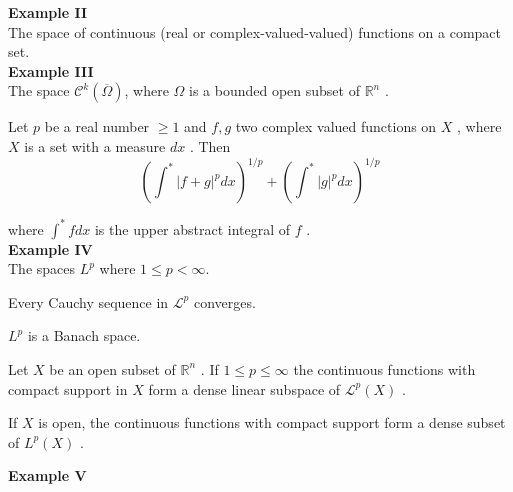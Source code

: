 \textbf{Example II} \\
The space of continuous (real or complex-valued-valued) functions on a compact set. \\

\textbf{Example III} \\
The space $ \mathcal{C}^{ k } \left( \overline{ \Omega } \right) $, where $ \Omega $ is a bounded open subset of $ \mathbb{R}^{ n } $ .

\begin{thm}
	Let $ p $ be a real number $ \geq 1 $ and $ f,g $ two complex valued functions on $ X $ , where $ X $ is a set with a measure $ dx $ . Then 
	\[
		\left( \int^{ * } \vert f+g \vert^{ p } dx \right)^{ 1/p } + \left( \int^{ * } \vert g \vert^{ p } dx \right)^{ 1/p }
	\]
\end{thm}

where $ \int^{ * }f dx $ is the upper abstract integral of $ f $ . \\

\textbf{Example IV} \\
The spaces $ L^p $ where $ 1 \leq p  < \infty$. \\

\begin{thm}
	Every Cauchy sequence in $ \mathcal{L}^{ p } $ converges.
\end{thm}

\begin{cor}
	$ L^{ p } $ is a Banach space.
\end{cor}

\begin{thm}
	Let $ X $ be an open subset of $ \mathbb{R}^{ n } $ . If $ 1 \leq p \leq \infty $ the continuous functions with compact support in $ X $ form a dense linear subspace of $ \mathcal{L}^{ p } (X) $ .
\end{thm}

\begin{cor}
	If $ X $  is open, the continuous functions with compact support form a dense subset of $ L^{ p }(X) $ . 
\end{cor}

\textbf{Example V} \\

